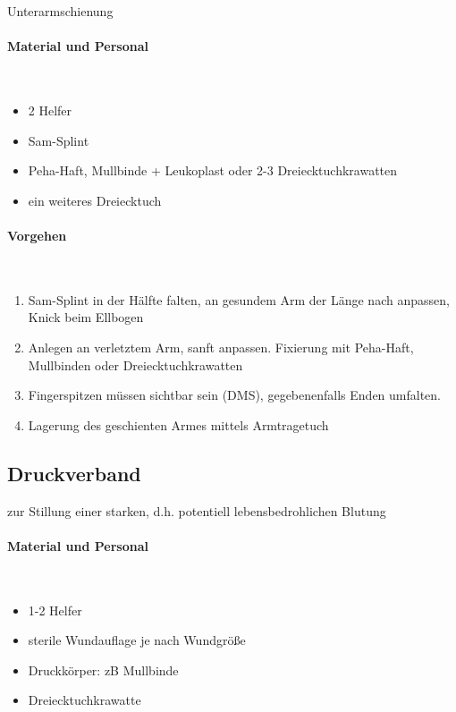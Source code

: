 Unterarmschienung

\paragraph*{Material und Personal}~

\begin{itemize}
    \item 2 Helfer
    \item Sam-Splint
    \item Peha-Haft, Mullbinde + Leukoplast oder 2-3 Dreiecktuchkrawatten
    \item ein weiteres Dreiecktuch
\end{itemize}


\paragraph*{Vorgehen}~

\begin{enumerate}
    \item Sam-Splint in der Hälfte falten, an gesundem Arm der Länge
    nach anpassen, Knick beim Ellbogen
    \item Anlegen an verletztem Arm, sanft anpassen. Fixierung mit
    Peha-Haft, Mullbinden oder Dreiecktuchkrawatten
    \item Fingerspitzen müssen sichtbar sein (DMS), gegebenenfalls Enden
    umfalten.
    \item Lagerung des geschienten Armes mittels Armtragetuch
\end{enumerate}



\subsection{Druckverband}
\label{topic:druckverband-anlegen}

zur Stillung einer starken, d.h. potentiell lebensbedrohlichen Blutung

\paragraph*{Material und Personal}~

\begin{itemize}
    \item 1-2 Helfer
    \item sterile Wundauflage je nach Wundgröße
    \item Druckkörper: zB Mullbinde
    \item Dreiecktuchkrawatte
\end{itemize}


